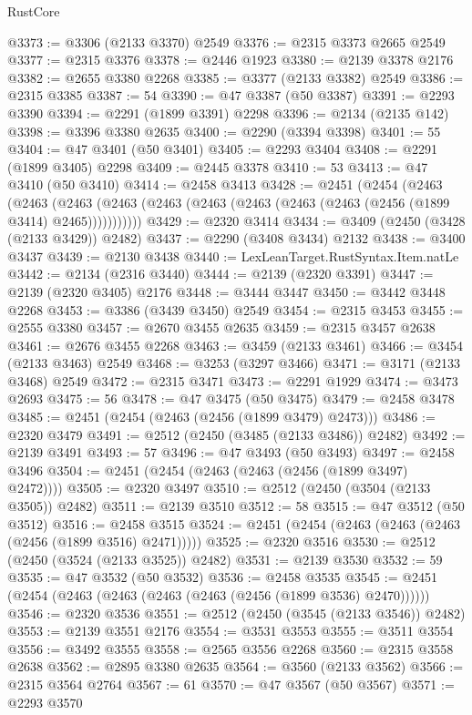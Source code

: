 \begin{lexlean}{RustCore}
\begin{coremodule}
@3373 := @3306 (@2133 @3370) @2549
@3376 := @2315 @3373 @2665 @2549
@3377 := @2315 @3376
@3378 := @2446 @1923
@3380 := @2139 @3378 @2176
@3382 := @2655 @3380 @2268
@3385 := @3377 (@2133 @3382) @2549
@3386 := @2315 @3385
@3387 := 54
@3390 := @47 @3387 (@50 @3387)
@3391 := @2293 @3390
@3394 := @2291 (@1899 @3391) @2298
@3396 := @2134 (@2135 @142)
@3398 := @3396 @3380 @2635
@3400 := @2290 (@3394 @3398)
@3401 := 55
@3404 := @47 @3401 (@50 @3401)
@3405 := @2293 @3404
@3408 := @2291 (@1899 @3405) @2298
@3409 := @2445 @3378
@3410 := 53
@3413 := @47 @3410 (@50 @3410)
@3414 := @2458 @3413
@3428 := @2451
    (@2454
      (@2463
        (@2463
          (@2463 (@2463 (@2463 (@2463 (@2463 (@2463 (@2463 (@2456 (@1899 @3414) @2465)))))))))))
@3429 := @2320 @3414
@3434 := @3409 (@2450 (@3428 (@2133 @3429)) @2482)
@3437 := @2290 (@3408 @3434) @2132
@3438 := @3400 @3437
@3439 := @2130 @3438
@3440 := LexLeanTarget.RustSyntax.Item.natLe
@3442 := @2134 (@2316 @3440)
@3444 := @2139 (@2320 @3391)
@3447 := @2139 (@2320 @3405) @2176
@3448 := @3444 @3447
@3450 := @3442 @3448 @2268
@3453 := @3386 (@3439 @3450) @2549
@3454 := @2315 @3453
@3455 := @2555 @3380
@3457 := @2670 @3455 @2635
@3459 := @2315 @3457 @2638
@3461 := @2676 @3455 @2268
@3463 := @3459 (@2133 @3461)
@3466 := @3454 (@2133 @3463) @2549
@3468 := @3253 (@3297 @3466)
@3471 := @3171 (@2133 @3468) @2549
@3472 := @2315 @3471
@3473 := @2291 @1929
@3474 := @3473 @2693
@3475 := 56
@3478 := @47 @3475 (@50 @3475)
@3479 := @2458 @3478
@3485 := @2451 (@2454 (@2463 (@2456 (@1899 @3479) @2473)))
@3486 := @2320 @3479
@3491 := @2512 (@2450 (@3485 (@2133 @3486)) @2482)
@3492 := @2139 @3491
@3493 := 57
@3496 := @47 @3493 (@50 @3493)
@3497 := @2458 @3496
@3504 := @2451 (@2454 (@2463 (@2463 (@2456 (@1899 @3497) @2472))))
@3505 := @2320 @3497
@3510 := @2512 (@2450 (@3504 (@2133 @3505)) @2482)
@3511 := @2139 @3510
@3512 := 58
@3515 := @47 @3512 (@50 @3512)
@3516 := @2458 @3515
@3524 := @2451 (@2454 (@2463 (@2463 (@2463 (@2456 (@1899 @3516) @2471)))))
@3525 := @2320 @3516
@3530 := @2512 (@2450 (@3524 (@2133 @3525)) @2482)
@3531 := @2139 @3530
@3532 := 59
@3535 := @47 @3532 (@50 @3532)
@3536 := @2458 @3535
@3545 := @2451 (@2454 (@2463 (@2463 (@2463 (@2463 (@2456 (@1899 @3536) @2470))))))
@3546 := @2320 @3536
@3551 := @2512 (@2450 (@3545 (@2133 @3546)) @2482)
@3553 := @2139 @3551 @2176
@3554 := @3531 @3553
@3555 := @3511 @3554
@3556 := @3492 @3555
@3558 := @2565 @3556 @2268
@3560 := @2315 @3558 @2638
@3562 := @2895 @3380 @2635
@3564 := @3560 (@2133 @3562)
@3566 := @2315 @3564 @2764
@3567 := 61
@3570 := @47 @3567 (@50 @3567)
@3571 := @2293 @3570

\end{coremodule}
\end{lexlean}
